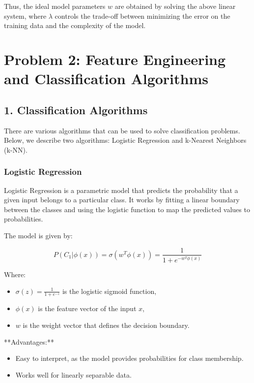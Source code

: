Thus, the ideal model parameters \( w \) are obtained by solving the above linear system, where \( \lambda \) controls the trade-off between minimizing the error on the training data and the complexity of the model.


\newpage
\section*{Problem 2: Feature Engineering and Classification Algorithms}

\subsection*{1. Classification Algorithms}

There are various algorithms that can be used to solve classification problems. Below, we describe two algorithms: Logistic Regression and k-Nearest Neighbors (k-NN).

\subsubsection*{Logistic Regression}

Logistic Regression is a parametric model that predicts the probability that a given input belongs to a particular class. It works by fitting a linear boundary between the classes and using the logistic function to map the predicted values to probabilities.

The model is given by:

\[
P(C_1 | \phi(x)) = \sigma(w^T \phi(x)) = \frac{1}{1 + e^{-w^T \phi(x)}}
\]

Where:
\begin{itemize}
    \item \( \sigma(z) = \frac{1}{1 + e^{-z}} \) is the logistic sigmoid function,
    \item \( \phi(x) \) is the feature vector of the input \( x \),
    \item \( w \) is the weight vector that defines the decision boundary.
\end{itemize}

**Advantages:**
\begin{itemize}
    \item Easy to interpret, as the model provides probabilities for class membership.
    \item Works well for linearly separable data.
\end{itemize}

